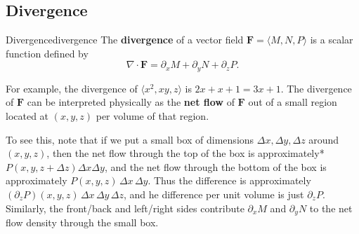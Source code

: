\documentclass[svgnames]{watsonbook}
\begin{document}
\subsection{Divergence}


\begin{defn}{Divergence}{divergence}
  The \textbf{divergence} of a vector field $\mathbf{F} = \langle M, N, P \rangle$ is a scalar function defined by
\[
  \nabla \cdot \mathbf{F} = \partial_x M  +\partial _y N + \partial_z
  P. 
\]
\end{defn}

For example, the divergence of $\langle x^2, xy, z \rangle$ is
$2x + x + 1 = 3x + 1$. The divergence of $\mathbf{F}$ can be
interpreted physically as the \textbf{net flow} of $\mathbf{F}$ out of
a small region located at $(x,y,z)$ per volume of that region. 

To see this, note that if we put a small box of dimensions $\Delta x, \Delta y, \Delta z$
around $(x,y,z)$, then the net flow through the top of the box is
approximately* $P(x,y,z+\Delta z)\Delta x \Delta y$, and the net flow
through the bottom of the box is approximately
$P(x, y, z)\, \Delta x \,\Delta y$. Thus the difference is approximately
$(\partial_z P)(x,y,z) \, \Delta x \,  \Delta y \, \Delta z$, and he
difference per unit volume is just $\partial_z P$. Similarly, the front/back
and left/right sides contribute $\partial_x M$ and $\partial_y N$ to
the net flow density through the small box.
\end{document}
